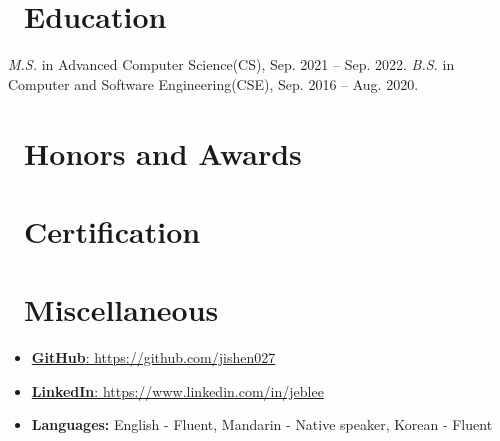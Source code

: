 \documentclass{resume}
\begin{document}
\section{\faGraduationCap\ Education}
\textit{M.S.} in Advanced Computer Science(CS), Sep. 2021 -- Sep. 2022.
\textit{B.S.} in Computer and Software Engineering(CSE), Sep. 2016 -- Aug. 2020.

\section{\faHeartO\ Honors and Awards}

\section{\faCertificate\ Certification}

\section{\faInfo\ Miscellaneous}
\begin{itemize}[parsep=0.5ex]
  \item \href{https://github.com/jishen027}{\textbf{GitHub}: https://github.com/jishen027}
  \item \href{https://www.linkedin.com/in/jeblee}{\textbf{LinkedIn}: https://www.linkedin.com/in/jeblee} 
  \item \textbf{Languages:} English - Fluent, Mandarin - Native speaker, Korean - Fluent
\end{itemize}


%
%
\end{document}
